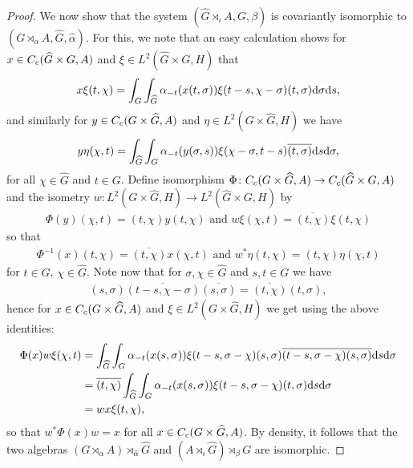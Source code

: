 \begin{proof}
We now show that the system $(\hat G \rtimes_\iota  A , G, \beta)$ is covariantly isomorphic to $(G \rtimes_\alpha A, \hat G, \hat \alpha)$. For this, we note that an easy calculation shows for $x \in C_c(\widehat{G} \times G, A)$ and $\xi \in L^2(\hat G \times G, H)$ that
\begin{align*}
	x \xi(t, \chi)=\int_G \int_{\widehat{G}} \alpha_{-t}(x(t, \sigma)) \xi(t-s,\chi-\sigma)(t,\sigma)\mathrm{d} \sigma \mathrm{d} s,	
\end{align*}
and similarly for $y \in C_c(G \times \widehat{G}, A)$ and $\eta \in L^2(G \times \hat G, H)$ we have
\begin{align*}
	y \eta(\chi,t) = \int_{\widehat{G}} \int_G \alpha_{-t}(y(\sigma,s)) \xi(\chi-\sigma, t-s) \overline{(t,\sigma)} \mathrm{d} s \mathrm{d} \sigma,
\end{align*}
for all $\chi \in \hat G$ and $t \in G$. Define isomorphism $\Phi \colon C_c(G \times \widehat{G}, A) \to C_c(\widehat{G}\times G , A)$ and the isometry $w \colon L^2(G \times \hat G, H) \to L^2(\hat G \times G, H)$ by
\begin{align*}
	\Phi(y)(\chi,t) = (t,\chi) y(t,\chi) \text{ and } w \xi(\chi,t) = \overline{(t,\chi)} \xi(t,\chi)	
\end{align*}
so that
\begin{align*}
	\Phi^{-1}(x)(t,\chi) = \overline{(t,\chi)} x(\chi,t) \text{ and } w^* \eta(t,\chi) = (t,\chi) \eta(\chi,t)	
\end{align*}
for $t \in G$, $\chi \in \hat G$. Note now that for $\sigma, \chi \in \hat G$ and $s,t \in G$ we have
\begin{align*}
	(s,\sigma) \overline{(t-s,\chi- \sigma)}\overline{(s,\sigma)} = \overline{(t,\chi)}(t,\sigma),
\end{align*}
hence for $x \in C_c(G \times \widehat{G}, A)$ and $\xi \in L^2(G \times \hat G,H)$ we get using the above identities:
\begin{align*}
	\Phi(x) w \xi(\chi,t)&= \int_{\widehat{G}} \int_G \alpha_{-t}(x(s, \sigma)) \xi(t-s, \sigma- \chi)(s, \sigma) \overline{(t-s,\sigma-\chi)}\overline{(s,\sigma)} \mathrm{d} s \mathrm{d} \sigma\\
	&= \overline{(t,\chi)} \int_{\widehat{G}} \int_G \alpha_{-t}(x(s,\sigma)) \xi(t-s,\sigma-\chi)(t,\sigma) \mathrm{d} s \mathrm{d} \sigma\\
	&= w x \xi(t,\chi),
\end{align*}
so that $w^* \Phi(x) w = x$ for all $x \in C_c(G \times \widehat{G}, A)$. By density, it follows that the two algebras $(G \rtimes_\alpha A) \rtimes_{\hat \alpha} \hat G $ and $(A \rtimes_{\iota} \hat G)\rtimes_{\beta} G$ are isomorphic.
\end{proof}
